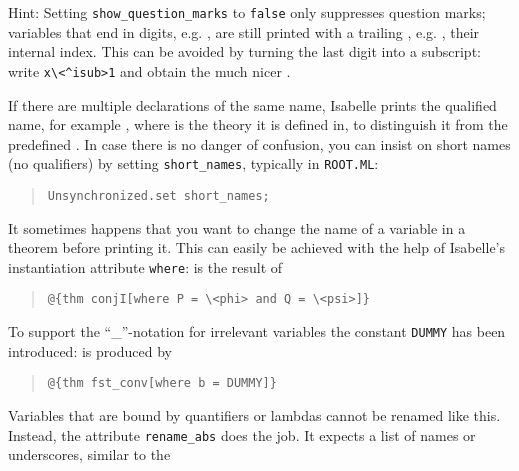 \begin{isabellebody}
\begin{isamarkuptext}
Hint: Setting \verb!show_question_marks! to \texttt{false} only
suppresses question marks; variables that end in digits,
e.g. , are still printed with a trailing ,
e.g. , their internal index. This can be avoided by
turning the last digit into a subscript: write \verb!x\<^isub>1! and
obtain the much nicer .%
\end{isamarkuptext}%
\isamarkuptrue%
%
\isadelimML
%
\endisadelimML
%
\isatagML
%
\endisatagML
{\isafoldML}%
%
\isadelimML
%
\endisadelimML
%
\isamarkuptrue%
%
\begin{isamarkuptext}%
If there are multiple declarations of the same name, Isabelle prints
the qualified name, for example , where  is the
theory it is defined in, to distinguish it from the predefined . In case there is no danger of confusion, you can insist on
short names (no qualifiers) by setting \verb!short_names!, typically
in \texttt{ROOT.ML}:
\begin{quote}
\verb|Unsynchronized.set short_names|\verb!;!
\end{quote}%
\end{isamarkuptext}%
\isamarkuptrue%
%
\isamarkuptrue%
%
\begin{isamarkuptext}%
It sometimes happens that you want to change the name of a
variable in a theorem before printing it. This can easily be achieved
with the help of Isabelle's instantiation attribute \texttt{where}:
\isa{{\isasymlbrakk}{\isasymphi}{\isacharsemicolon}\ {\isasympsi}{\isasymrbrakk}\ {\isasymLongrightarrow}\ {\isasymphi}\ {\isasymand}\ {\isasympsi}} is the result of
\begin{quote}
\verb!@!\verb!{thm conjI[where P = \<phi> and Q = \<psi>]}!
\end{quote}
To support the ``\_''-notation for irrelevant variables
the constant \texttt{DUMMY} has been introduced:
 is produced by
\begin{quote}
\verb!@!\verb!{thm fst_conv[where b = DUMMY]}!
\end{quote}
Variables that are bound by quantifiers or lambdas cannot be renamed
like this. Instead, the attribute \texttt{rename\_abs} does the
job. It expects a list of names or underscores, similar to the

\end{isamarkuptext}
\end{isabellebody}
